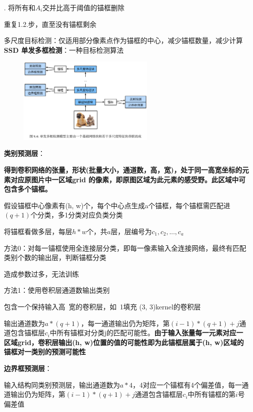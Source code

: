 \documentclass[UTF8]{ctexart}
\begin{document}
  \quad {}. 将所有和$A_i$交并比高于阈值的锚框删除

  \quad \quad 重复1.2.步，直至没有锚框剩余

  多尺度目标检测：仅适用部分像素点作为锚框的中心，减少锚框数量，减少计算\\
\textbf{SSD 单发多框检测}：一种目标检测算法

  \begin{figure}[H] %
    \centering %
    \includegraphics[width=0.6\textwidth]{note_images/SSD_archi.png} %
  \end{figure}

  \textbf{类别预测层}：

  \quad \textbf{得到卷积网络的张量，形状(批量大小，通道数，高，宽)，处于同一高宽坐标的元素对应原图片中一区域grid 的像素，即原图区域为此元素的感受野。此区域中可包含多个锚框。}
    
  \quad 假设锚框中心像素有(h, w)个，每个中心点生成a个锚框，每个锚框需匹配进$(q+1)$个分类，多1分类对应负类分类

  \quad \quad 将锚框看做多层，每层$h*w$个，共$a$层，层编号为$c_1, c_2, ..., c_a$

  \quad 方法0：对每一锚框使用全连接层分类，即每一像素输入全连接网络，最终有匹配类别个数的输出层，判断锚框分类

  \quad \quad 造成参数过多，无法训练

  \quad 方法1：使用卷积层通道数输出类别

  \quad \quad 包含一个保持输入高\ 宽的卷积层，如\ 1填充 (3, 3)kernel的卷积层

  \quad \quad 输出通道数为$a * (q+1)$，每一通道输出仍为矩阵，第$(i-1)*(q+1) + j$通道包含锚框层$c_i$中所有锚框对分类j的匹配可能性。\textbf{由于输入张量每一元素对应一区域grid，卷积层输出(h, w)位置的值的可能性即为此锚框层属于(h, w)区域的锚框对一类别的预测可能性}

  \textbf{边界框预测层}：

  \quad 输入结构同类别预测层，输出通道数为$a * 4$，4对应一个锚框有4个偏差值，每一通道输出仍为矩阵，第$(i-1)*(q+1) + j$通道包含锚框层$c_i$中所有锚框的第$i$号偏差值
\end{document}
